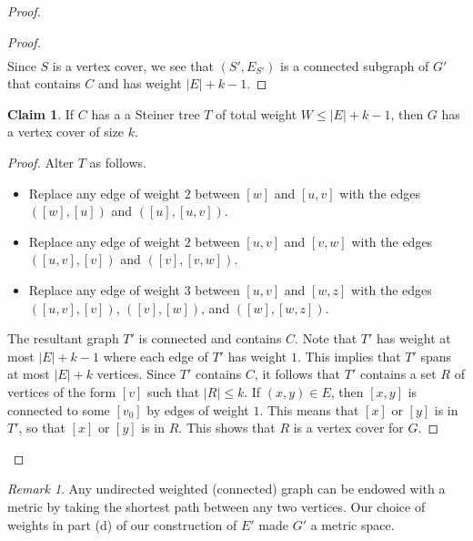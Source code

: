 \documentclass[10pt,letterpaper,cm]{nupset}
\theoremstyle{definition}
\theoremstyle{theorem}
\newtheorem*{claim}{Claim}
\theoremstyle{remark}
\newtheorem{remark}[definition]{Remark}
\newcommand{\1}{\mathbf{1}}
\newcommand{\0}{\vec 0}
\begin{document}
\begin{proof}
\begin{proof}
\begin{align*}
\end{align*} Since $S$ is a vertex cover, we see that $(S', E_{S'})$ is a connected subgraph of $G'$ that contains $C$ and has weight $|E|+k -1$.
\end{proof}
\begin{claim}
If $C$ has a a Steiner tree $T$ of total weight $W \leq |E| +k -1$, then $G$ has a vertex cover of size $k$. 
\end{claim}
\begin{proof}
Alter $T$ as follows.
\begin{itemize}
\item Replace any edge of weight $2$ between $[w]$ and $[u,v]$ with the edges $\left([w], [u]\right)$ and $\left([u], [u,v]\right)$.
\item Replace any edge of weight $2$ between $[u,v]$ and $[v,w]$ with the edges $\left([u,v], [v]\right)$ and $\left([v], [v,w]\right)$.
\item Replace any edge of weight $3$ between $[u,v]$ and $[w,z]$ with the edges $\left([u,v], [v]\right)$, $\left([v], [w]\right)$, and $\left([w], [w,z]\right)$.
\end{itemize}
The resultant graph $T'$ is connected and contains $C$. Note that $T'$ has weight at most $|E| + k -1$ where each edge of $T'$ has weight $1$. This implies that $T'$ spans at most $|E| +k$ vertices. Since $T'$ contains $C$, it follows that $T'$ contains a set $R$ of vertices of the form $[v]$ such that $|R|\leq k$. If $(x,y)\in E$, then $[x,y]$ is connected to some $[v_0]$ by edges of weight $1$. This means that $[x]$ or $[y]$ is in $T'$, so that $[x]$ or $[y]$ is in $R$. This shows that $R$ is a vertex cover for $G$.
\end{proof}
\end{proof}

\begin{remark}
Any undirected  weighted (connected) graph can be endowed with a metric by taking the shortest path between any two vertices. Our choice of weights in part (d) of our construction of $E'$ made $G'$ a metric space. 
\end{remark}
\end{document}

